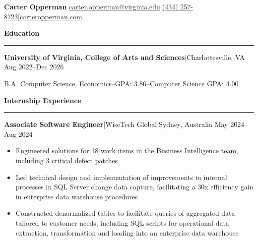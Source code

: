 \documentclass[11pt,letterpaper]{article}
\newcommand{\horibar}[2]{#1\hspace{5pt}|\hspace{5pt}#2}
\newcommand{\sep}[1]{\par\vspace{#1}}
\renewenvironment{section}[1]{
\sep{11pt}
{
\fontsize{14}{2}
\selectfont
\textbf{#1}\\[0.5pt]
}
\sep{4pt}
\noindent\rule{\linewidth}{0.5pt}
\sep{4pt}
}
{
}
\renewenvironment{subsection}[3]
{
\sep{4pt}
\horibar{\textbf{#1}}{#2} \hfill #3
\par\setstretch{1}
\begin{itemize}
}
{
\end{itemize}
\setstretch{0}
}
\begin{document}
{\fontsize{20}{1} \selectfont \textbf{Carter Opperman}} \hfill \horibar{\href{mailto:carter.opperman@virginia.edu}{carter.opperman@virginia.edu}}{\horibar{\href{tel:+14342578723}{(434) 257-8723}}{\href{https://carteropperman.com}{carteropperman.com}}}
\sep{5pt}

\begin{section}{Education}
    \sep{4pt}
    \horibar{\textbf{University of Virginia, College of Arts and Sciences}}{Charlottesville, VA} \hfill Aug 2022–Dec 2026
    \sep{4pt}
    \par\hspace{6pt}B.A. Computer Science, Economics\hspace{5pt}–\hspace{5pt}GPA: 3.86\hspace{5pt}–\hspace{5pt}Computer Science GPA: 4.00
    \sep{2pt}
\end{section}

\begin{section}{Internship Experience}
    \begin{subsection}{Associate Software Engineer}{\horibar{WiseTech Global}{Sydney, Australia}}{May 2024–Aug 2024}
        \item Engineered solutions for 18 work items in the Business Intelligence team, including 3 critical defect patches
        \item Led technical design and implementation of improvements to internal processes in SQL Server change data capture, facilitating a 30x efficiency gain in enterprise data warehouse procedures
        \item Constructed denormalized tables to facilitate queries of aggregated data tailored to customer needs, including SQL scripts for operational data extraction, transformation and loading into an enterprise data warehouse
    \end{subsection}
\end{section}
\end{document}
